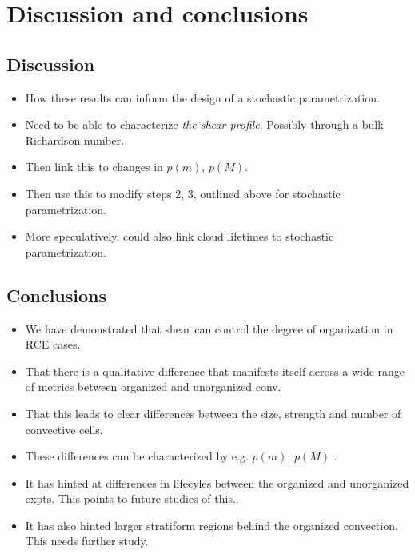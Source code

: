 \documentclass[11pt,a4paper]{article}
\begin{document}
\newpage
\section{Discussion and conclusions}

\subsection{Discussion}
\begin{itemize}
    \item How these results can inform the design of a stochastic parametrization.
    \item Need to be able to characterize \textit{the shear profile}. Possibly through a bulk Richardson number.
    \item Then link this to changes in $p(m)$, $p(M)$.
    \item Then use this to modify steps 2, 3, outlined above for stochastic parametrization.
    \item More speculatively, could also link cloud lifetimes to stochastic parametrization.
\end{itemize}

\subsection{Conclusions}
\begin{itemize}
    \item We have demonstrated that shear can control the degree of organization in RCE cases.
    \item That there is a qualitative difference that manifests itself across a wide range of metrics between organized and unorganized conv.
    \item That this leads to clear differences between the size, strength and number of convective cells.
    \item These differences can be characterized by e.g. $p(m)$, $p(M)$ .
    \item It has hinted at differences in lifecyles between the organized and unorganized expts. This points to future studies of this..
    \item It has also hinted larger stratiform regions behind the organized convection. This needs further study.
\end{itemize}
\end{document}
